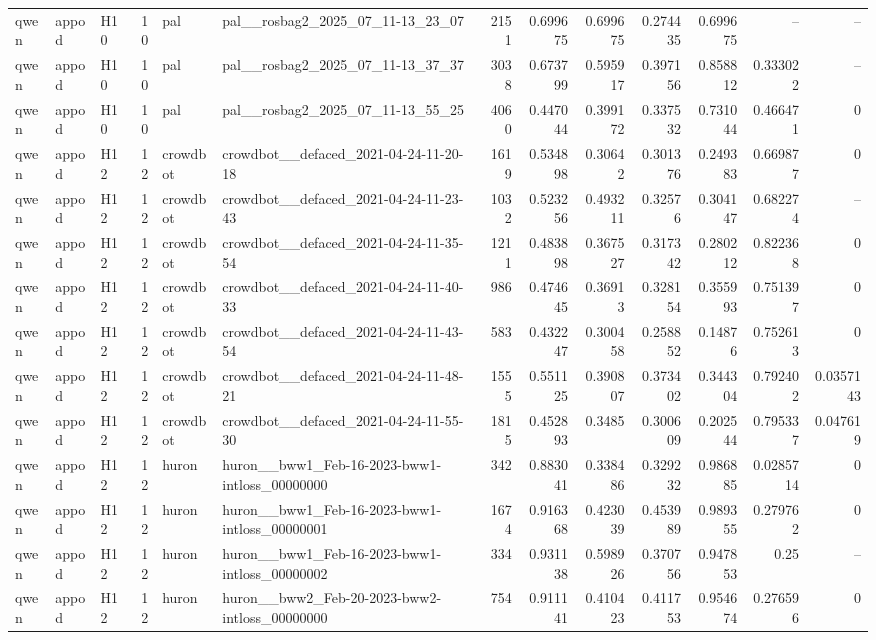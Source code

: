 \begin{longtable}{lllrllrrrrrrr}
qwen & appod & H10 & 10 & pal & pal\_\_rosbag2\_2025\_07\_11-13\_23\_07 & 2151 & 0.699675 & 0.699675 & 0.274435 & 0.699675 & -- & -- \\
qwen & appod & H10 & 10 & pal & pal\_\_rosbag2\_2025\_07\_11-13\_37\_37 & 3038 & 0.673799 & 0.595917 & 0.397156 & 0.858812 & 0.333022 & -- \\
qwen & appod & H10 & 10 & pal & pal\_\_rosbag2\_2025\_07\_11-13\_55\_25 & 4060 & 0.447044 & 0.399172 & 0.337532 & 0.731044 & 0.466471 & 0 \\
qwen & appod & H12 & 12 & crowdbot & crowdbot\_\_defaced\_2021-04-24-11-20-18 & 1619 & 0.534898 & 0.30642 & 0.301376 & 0.249383 & 0.669877 & 0 \\
qwen & appod & H12 & 12 & crowdbot & crowdbot\_\_defaced\_2021-04-24-11-23-43 & 1032 & 0.523256 & 0.493211 & 0.32576 & 0.304147 & 0.682274 & -- \\
qwen & appod & H12 & 12 & crowdbot & crowdbot\_\_defaced\_2021-04-24-11-35-54 & 1211 & 0.483898 & 0.367527 & 0.317342 & 0.280212 & 0.822368 & 0 \\
qwen & appod & H12 & 12 & crowdbot & crowdbot\_\_defaced\_2021-04-24-11-40-33 & 986 & 0.474645 & 0.36913 & 0.328154 & 0.355993 & 0.751397 & 0 \\
qwen & appod & H12 & 12 & crowdbot & crowdbot\_\_defaced\_2021-04-24-11-43-54 & 583 & 0.432247 & 0.300458 & 0.258852 & 0.14876 & 0.752613 & 0 \\
qwen & appod & H12 & 12 & crowdbot & crowdbot\_\_defaced\_2021-04-24-11-48-21 & 1555 & 0.551125 & 0.390807 & 0.373402 & 0.344304 & 0.792402 & 0.0357143 \\
qwen & appod & H12 & 12 & crowdbot & crowdbot\_\_defaced\_2021-04-24-11-55-30 & 1815 & 0.452893 & 0.3485 & 0.300609 & 0.202544 & 0.795337 & 0.047619 \\
qwen & appod & H12 & 12 & huron & huron\_\_bww1\_Feb-16-2023-bww1-intloss\_00000000 & 342 & 0.883041 & 0.338486 & 0.329232 & 0.986885 & 0.0285714 & 0 \\
qwen & appod & H12 & 12 & huron & huron\_\_bww1\_Feb-16-2023-bww1-intloss\_00000001 & 1674 & 0.916368 & 0.423039 & 0.453989 & 0.989355 & 0.279762 & 0 \\
qwen & appod & H12 & 12 & huron & huron\_\_bww1\_Feb-16-2023-bww1-intloss\_00000002 & 334 & 0.931138 & 0.598926 & 0.370756 & 0.947853 & 0.25 & -- \\
qwen & appod & H12 & 12 & huron & huron\_\_bww2\_Feb-20-2023-bww2-intloss\_00000000 & 754 & 0.911141 & 0.410423 & 0.411753 & 0.954674 & 0.276596 & 0 \\

\end{longtable}
